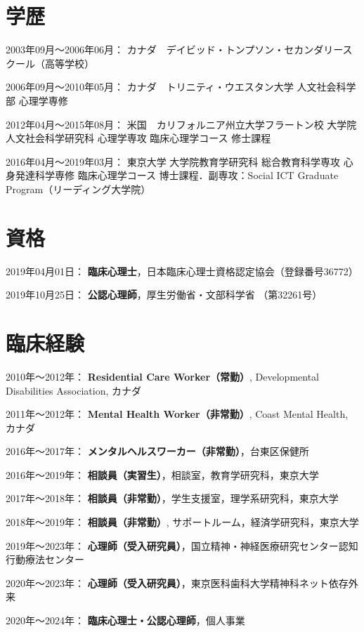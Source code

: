 \documentclass[11pt,a4paper]{article}
\begin{document}
\section{学歴}
\begin{description}
	\item 2003年09月～2006年06月： カナダ　デイビッド・トンプソン・セカンダリースクール（高等学校）
	\item 2006年09月～2010年05月： カナダ　トリニティ・ウエスタン大学 人文社会科学部 心理学専修
	\item 2012年04月～2015年08月： 米国　カリフォルニア州立大学フラートン校 大学院人文社会科学研究科 心理学専攻 臨床心理学コース 修士課程
	\item 2016年04月～2019年03月： 東京大学 大学院教育学研究科 総合教育科学専攻 心身発達科学専修 臨床心理学コース 博士課程．副専攻：Social ICT Graduate Program（リーディング大学院）
\end{description}
\section{資格}
\begin{description}
	\item 2019年04月01日： \textbf{臨床心理士}，日本臨床心理士資格認定協会（登録番号36772）
	\item 2019年10月25日： \textbf{公認心理師}，厚生労働省・文部科学省 （第32261号）
\end{description}

\section{臨床経験}
	\begin{description}
	\item 2010年〜2012年： \textbf{Residential Care Worker（常勤）}, Developmental Disabilities Association, カナダ
	\item 2011年〜2012年： \textbf{Mental Health Worker（非常勤）}, Coast Mental Health, カナダ
	\item 2016年〜2017年： \textbf{メンタルヘルスワーカー（非常勤）}，台東区保健所
	\item 2016年〜2019年： \textbf{相談員（実習生）}，相談室，教育学研究科，東京大学
	\item 2017年〜2018年： \textbf{相談員（非常勤）}，学生支援室，理学系研究科，東京大学
	\item 2018年〜2019年： \textbf{相談員（非常勤）}, サポートルーム，経済学研究科，東京大学
	\item 2019年〜2023年： \textbf{心理師（受入研究員）}，国立精神・神経医療研究センター認知行動療法センター
	\item 2020年〜2023年： \textbf{心理師（受入研究員）}，東京医科歯科大学精神科ネット依存外来
	\item 2020年〜2024年： \textbf{臨床心理士・公認心理師}，個人事業
	\end{description}
\end{document}
